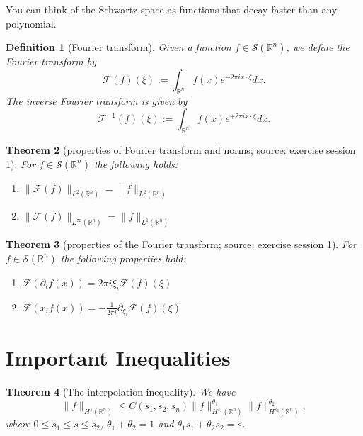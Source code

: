 \documentclass[12pt,a4paper]{article}
\newtheorem{definition}{Definition}
\newtheorem{thm}[definition]{Theorem}
\newcommand{\Rn}{\mathbb{R}^n}
\begin{document}
You can think of the Schwartz space as functions that decay faster than any polynomial.

\begin{definition}[Fourier transform]
Given a function $f\in \mathcal{S}(\mathbb{R}^n)$, we define the Fourier transform by
\begin{equation}
\mathcal{F}(f)(\xi):=\int_{\Rn} f(x)e^{-2\pi ix\cdot \xi} dx.
\end{equation}
The inverse Fourier transform is given by
\begin{equation}
\mathcal{F}^{-1}(f)(\xi):=\int_{\Rn} f(x)e^{+2\pi ix\cdot \xi} dx.
\end{equation}
\end{definition}

\begin{thm}[properties of Fourier transform and norms; source: exercise session 1]
For $f\in \mathcal{S}(\mathbb{R}^n)$ the following holds:
\begin{enumerate}
\item $\lVert \mathcal{F}(f) \rVert_{L^2(\mathbb{R}^n)} = \lVert f \rVert_{L^2(\mathbb{R}^n)}$
\item $\lVert \mathcal{F}(f) \rVert_{L^{\infty}(\mathbb{R}^n)} = \lVert f \rVert_{L^1(\mathbb{R}^n)}$
\end{enumerate}
\end{thm}

\begin{thm}[properties of the Fourier transform; source: exercise session 1]
For $f\in \mathcal{S}(\mathbb{R}^n)$ the following properties hold:
\begin{enumerate}
\item $\mathcal{F}(\partial_if(x))=2\pi i \xi_i \mathcal{F}(f)(\xi)$ 
\item $\mathcal{F}(x_if(x))=-\frac{1}{2\pi i} \partial_{\xi_i} \mathcal{F}(f)(\xi)$
\end{enumerate}
\end{thm}

\section{Important Inequalities}

\begin{thm}[The interpolation inequality]
We have
\begin{equation}
\lVert f \rVert_{H^s(\Rn)} \leq C(s_1,s_2,s_n)\lVert f \rVert_{H^{s_1}(\Rn)}^{\theta_1} \lVert f \rVert_{H^{s_2}(\Rn)}^{\theta_2},
\end{equation}
where $0\leq s_1\leq s \leq s_2$, $\theta_1+\theta_2=1$ and $\theta_1s_1+\theta_2s_2=s$.
\end{thm}
\end{document}
